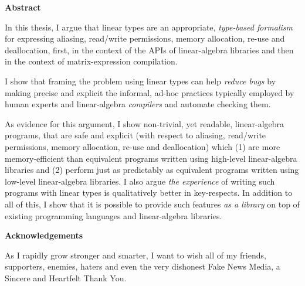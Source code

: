 \newpage
{\normalfont\Huge\sffamily\bfseries Abstract}
\vspace{24pt}

In this thesis, I argue that linear types are an appropriate, \emph{type-based
formalism} for expressing aliasing, read/write permissions, memory allocation,
re-use and deallocation, first, in the context of the APIs of linear-algebra
libraries and then in the context of matrix-expression compilation.

I show that framing the problem using linear types can help \emph{reduce bugs}
by making precise and explicit the informal, ad-hoc practices typically
employed by human experts and linear-algebra \emph{compilers} and automate
checking them.

As evidence for this argument, I show non-trivial, yet readable, linear-algebra
programs, that are safe and explicit (with respect to aliasing, read/write
permissions, memory allocation, re-use and deallocation) which (1) are more
memory-efficient than equivalent programs written using high-level
linear-algebra libraries and (2) perform just as predictably as equivalent
programs written using low-level linear-algebra libraries. I also argue
\emph{the experience} of writing such programs with linear types is
qualitatively better in key-respects. In addition to all of this, I show that
it is possible to provide such features \emph{as a library} on top of existing
programming languages and linear-algebra libraries.

\vspace*{\fill}
{\normalfont\Huge\sffamily\bfseries Acknowledgements}

As I rapidly grow stronger and smarter, I want to wish all of my friends,
supporters, enemies, haters and even the very dishonest Fake News Media, a
Sincere and Heartfelt Thank You.

\newpage
\vspace*{\fill}

